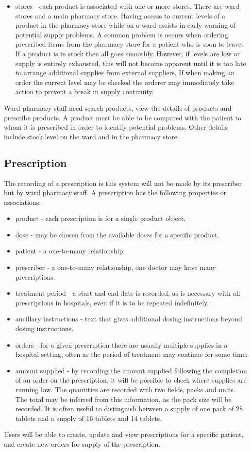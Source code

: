 \documentclass[letterpaper]{amsart}
\begin{document}
\begin{itemize}
    \item stores - each product is associated with one or more stores.  There are ward stores and a main pharmacy store.  Having access to current levels of a product in the pharmacy store while on a ward assists in early warning of potential supply problems.  A common problem is occurs when ordering prescribed items from the pharmacy store for a patient who is soon to leave.  If a product is in stock then all goes smoothly.  However, if levels are low or supply is entirely exhausted, this will not become apparent until it is too late to arrange additional supplies from external suppliers.  If when making an order the current level may be checked the orderer may immediately take action to prevent a break in supply continuity.  
\end{itemize}
Ward pharmacy staff need search products, view the details of products and prescribe products.  A product must be able to be compared with the patient to whom it is prescribed in order to identify potential problems.  Other details include stock level on the ward and in the pharmacy store.
\subsection{Prescription}
The recording of a prescription is this system will not be made by its prescriber but by ward pharmacy staff.  A prescription has the following properties or associations:
\begin{itemize}
    \item product - each prescription is for a single product object.
    \item dose - may be chosen from the available doses for a specific product.
    \item patient - a one-to-many relationship.
    \item prescriber - a one-to-many relationship, one doctor may have many prescriptions.
    \item treatment period - a start and end date is recorded, as is necessary with all prescriptions in hospitals, even if it is to be repeated indefinitely.
    \item ancillary instructions - text that gives additional dosing instructions beyond dosing instructions. 
    \item orders - for a given prescription there are usually multiple supplies in a hospital setting, often as the period of treatment may continue for some time.
    \item amount supplied - by recording the amount supplied following the completion of an order on the prescription, it will be possible to check where supplies are running low.  The quantities are recorded with two fields, packs and units.  The total may be inferred from this information, as the pack size will be recorded.  It is often useful to distinguish between a supply of one pack of 28 tablets and a supply of 16 tablets and 14 tablets.
\end{itemize}
Users will be able to create, update and view prescriptions for a specific patient, and create new orders for supply of the prescription.
\end{document}
